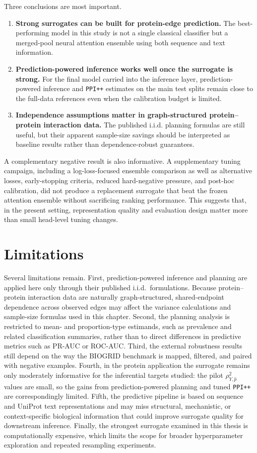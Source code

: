 Three conclusions are most important.
\begin{enumerate}
    \item \textbf{Strong surrogates can be built for protein-edge prediction.} The best-performing model in this study is not a single classical classifier but a merged-pool neural attention ensemble using both sequence and text information.
    \item \textbf{Prediction-powered inference works well once the surrogate is strong.} For the final model carried into the inference layer, prediction-powered inference and \texttt{PPI++} estimates on the main test splits remain close to the full-data references even when the calibration budget is limited.
    \item \textbf{Independence assumptions matter in graph-structured protein--protein interaction data.} The published i.i.d. planning formulas are still useful, but their apparent sample-size savings should be interpreted as baseline results rather than dependence-robust guarantees.
\end{enumerate}

A complementary negative result is also informative. A supplementary tuning campaign, including a log-loss-focused ensemble comparison as well as alternative losses, early-stopping criteria, reduced hard-negative pressure, and post-hoc calibration, did not produce a replacement surrogate that beat the frozen attention ensemble without sacrificing ranking performance. This suggests that, in the present setting, representation quality and evaluation design matter more than small head-level tuning changes.

\section{Limitations}

Several limitations remain. First, prediction-powered inference and planning are applied here only through their published i.i.d.\ formulations. Because protein--protein interaction data are naturally graph-structured, shared-endpoint dependence across observed edges may affect the variance calculations and sample-size formulas used in this chapter. Second, the planning analysis is restricted to mean- and proportion-type estimands, such as prevalence and related classification summaries, rather than to direct differences in predictive metrics such as PR-AUC or ROC-AUC. Third, the external robustness results still depend on the way the BIOGRID benchmark is mapped, filtered, and paired with negative examples. Fourth, in the protein application the surrogate remains only moderately informative for the inferential targets studied: the pilot \(\rho_{Y,\hat p}^2\) values are small, so the gains from prediction-powered planning and tuned \texttt{PPI++} are correspondingly limited. Fifth, the predictive pipeline is based on sequence and UniProt text representations and may miss structural, mechanistic, or context-specific biological information that could improve surrogate quality for downstream inference. Finally, the strongest surrogate examined in this thesis is computationally expensive, which limits the scope for broader hyperparameter exploration and repeated resampling experiments.


